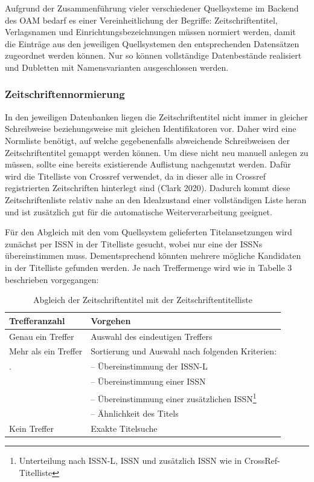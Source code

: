 \documentclass[a4paper,
fontsize=11pt,
oneside,
numbers=noperiodatend,
parskip=half-,
bibliography=totoc,
final
]{scrartcl}
\begin{document}
Aufgrund der Zusammenführung vieler verschiedener Quellsysteme im
Backend des OAM bedarf es einer Vereinheitlichung der Begriffe:
Zeitschriftentitel, Verlagsnamen und Einrichtungsbezeichnungen müssen
normiert werden, damit die Einträge aus den jeweiligen Quellsystemen den
entsprechenden Datensätzen zugeordnet werden können. Nur so können
vollständige Datenbestände realisiert und Dubletten mit Namensvarianten
ausgeschlossen werden.

\hypertarget{zeitschriftennormierung}{%
\subsubsection{Zeitschriftennormierung}\label{zeitschriftennormierung}}

In den jeweiligen Datenbanken liegen die Zeitschriftentitel nicht immer
in gleicher Schreibweise beziehungsweise mit gleichen Identifikatoren
vor. Daher wird eine Normliste benötigt, auf welche gegebenenfalls
abweichende Schreibweisen der Zeitschriftentitel gemappt werden können.
Um diese nicht neu manuell anlegen zu müssen, sollte eine bereits
existierende Auflistung nachgenutzt werden. Dafür wird die Titelliste
von Crossref verwendet, da in dieser alle in Crossref registrierten
Zeitschriften hinterlegt sind (Clark 2020). Dadurch kommt diese
Zeitschriftenliste relativ nahe an den Idealzustand einer vollständigen
Liste heran und ist zusätzlich gut für die automatische
Weiterverarbeitung geeignet.

Für den Abgleich mit den vom Quellsystem gelieferten Titelansetzungen
wird zunächst per ISSN in der Titelliste gesucht, wobei nur eine der
ISSNs übereinstimmen muss. Dementsprechend könnten mehrere mögliche
Kandidaten in der Titelliste gefunden werden. Je nach Treffermenge wird
wie in Tabelle 3 beschrieben vorgegangen:

\begin{table}[!ht]
    \centering
    \begin{tabular}{ll}
    \toprule
        \textbf{Trefferanzahl} & \textbf{Vorgehen} \\
        \midrule
Genau ein Treffer & Auswahl des eindeutigen Treffers \\
Mehr als ein Treffer & Sortierung und Auswahl nach folgenden Kriterien: \\
. & -- Übereinstimmung der ISSN-L \\
~ & -- Übereinstimmung einer ISSN \\
~ & -- Übereinstimmung einer zusätzlichen ISSN\footnote{Unterteilung nach ISSN-L, ISSN und zusätzlich ISSN wie in CrossRef-Titelliste} \\
~ & -- Ähnlichkeit des Titels \\
Kein Treffer & Exakte Titelsuche \\
  \bottomrule
\end{tabular}
           \caption{Abgleich der Zeitschriftentitel mit der Zeitschriftentitelliste}
\end{table}
\end{document}

